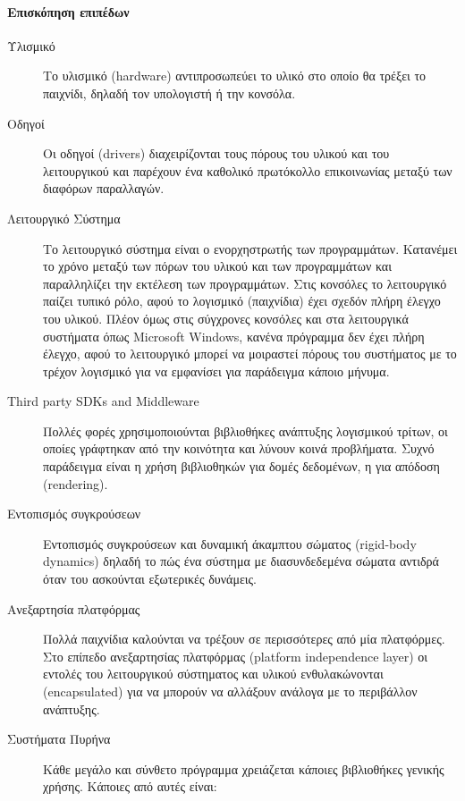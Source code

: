 \paragraph{Επισκόπηση επιπέδων}
\begin{description}	
\item [Υλισμικό]Το υλισμικό (hardware) αντιπροσωπεύει το υλικό στο οποίο θα τρέξει το παιχνίδι, δηλαδή τον υπολογιστή ή την κονσόλα.

\item [Οδηγοί]Οι οδηγοί (drivers) διαχειρίζονται τους πόρους του υλικού και του λειτουργικού και παρέχουν ένα καθολικό πρωτόκολλο επικοινωνίας μεταξύ των διαφόρων παραλλαγών.

\item [Λειτουργικό Σύστημα]Το λειτουργικό σύστημα είναι ο ενορχηστρωτής των προγραμμάτων. Κατανέμει το χρόνο μεταξύ των πόρων του υλικού και των προγραμμάτων και παραλληλίζει την εκτέλεση των προγραμμάτων. Στις κονσόλες το λειτουργικό παίζει τυπικό ρόλο, αφού το λογισμικό (παιχνίδια) έχει σχεδόν πλήρη έλεγχο του υλικού. Πλέον όμως στις σύγχρονες κονσόλες και στα λειτουργικά συστήματα όπως Microsoft Windows, κανένα πρόγραμμα δεν έχει πλήρη έλεγχο, αφού το λειτουργικό μπορεί να μοιραστεί πόρους του συστήματος με το τρέχον λογισμικό για να εμφανίσει για παράδειγμα κάποιο μήνυμα.

\item [Third party SDKs and Middleware]Πολλές φορές χρησιμοποιούνται βιβλιοθήκες ανάπτυξης λογισμικού τρίτων, οι οποίες γράφτηκαν από την κοινότητα και λύνουν κοινά προβλήματα. Συχνό παράδειγμα είναι η χρήση βιβλιοθηκών για δομές δεδομένων, η για απόδοση (rendering).

\item [Εντοπισμός συγκρούσεων]Εντοπισμός συγκρούσεων και δυναμική άκαμπτου σώματος (rigid-body dynamics) δηλαδή το πώς ένα σύστημα με διασυνδεδεμένα σώματα αντιδρά όταν του ασκούνται εξωτερικές δυνάμεις.

\item [Ανεξαρτησία πλατφόρμας]Πολλά παιχνίδια καλούνται να τρέξουν σε περισσότερες από μία πλατφόρμες. Στο επίπεδο ανεξαρτησίας πλατφόρμας (platform independence layer) οι εντολές του λειτουργικού σύστηματος  και υλικού ενθυλακώνονται (encapsulated) για να μπορούν να αλλάξουν ανάλογα με το περιβάλλον ανάπτυξης.

\item [Συστήματα Πυρήνα]Κάθε μεγάλο και σύνθετο πρόγραμμα χρειάζεται κάποιες βιβλιοθήκες γενικής χρήσης. Κάποιες από αυτές είναι: 


\end{description}
